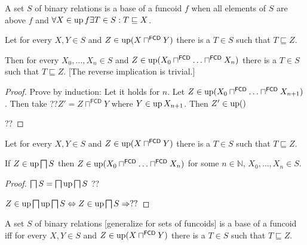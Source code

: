 
\begin{defn}
  A set $S$ of binary relations is a base of a funcoid $f$ when all elements
  of $S$ are above $f$ and $\forall X \in \operatorname{up} f \exists T \in S : T
  \sqsubseteq X$.
\end{defn}

\begin{lem}
  Let for every $X, Y \in S$ and $Z \in \operatorname{up} (X
  \sqcap^{\mathsf{FCD}} Y)$ there is a $T \in S$ such that $T
  \sqsubseteq Z$.
  
  Then for every $X_0, \ldots, X_n \in S$ and $Z \in \operatorname{up} (X_0
  \sqcap^{\mathsf{FCD}} \ldots \sqcap^{\mathsf{FCD}} X_n)$ there
  is a $T \in S$ such that $T \sqsubseteq Z$. [The reverse implication is
  trivial.]
\end{lem}

\begin{proof}
  Prove by induction: Let it holds for $n$. Let $Z \in \operatorname{up} (X_0
  \sqcap^{\mathsf{FCD}} \ldots \sqcap^{\mathsf{FCD}} X_{n +
  1})$. Then take ??$Z' = Z \sqcap^{\mathsf{FCD}} Y$ where $Y \in
  \operatorname{up} X_{n + 1}$. Then $Z' \in \operatorname{up} ()$
  
  ??
\end{proof}

\begin{lem}
  Let for every $X, Y \in S$ and $Z \in \operatorname{up} (X
  \sqcap^{\mathsf{FCD}} Y)$ there is a $T \in S$ such that $T
  \sqsubseteq Z$.
  
  If $Z \in \operatorname{up} \bigsqcap S$ then $Z \in \operatorname{up} (X_0
  \sqcap^{\mathsf{FCD}} \ldots \sqcap^{\mathsf{FCD}} X_n)$ for
  some $n \in \mathbb{N}$, $X_0, \ldots, X_n \in S$.
\end{lem}

\begin{proof}
  $\bigsqcap S = \bigsqcap \operatorname{up} \bigsqcap S$ ??
  
  $Z \in \operatorname{up} \bigsqcap \operatorname{up} \bigsqcap S \Leftrightarrow Z \in
  \operatorname{up} \bigsqcap S \Rightarrow ? ?$
\end{proof}

\begin{prop}
  A set $S$ of binary relations [generalize for sets of funcoids] is a base of
  a funcoid iff for every $X, Y \in S$ and $Z \in \operatorname{up} (X
  \sqcap^{\mathsf{FCD}} Y)$ there is a $T \in S$ such that $T
  \sqsubseteq Z$.
\end{prop}

